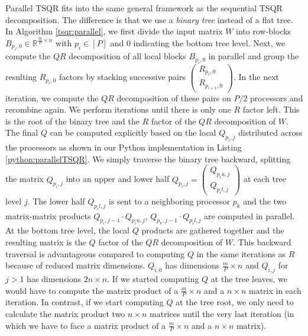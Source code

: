 \documentclass{article}
\begin{document}
Parallel TSQR fits into the same general framework as the sequential TSQR
decomposition. The difference is that we use a \textit{binary tree} instead of a
flat tree. In Algorithm \ref{tsqr:parallel}, we first divide the input matrix
$W$ into row-blocks $B_{p_i,0} \in \mathbb{R}^{\frac{m}{P} \times n}$ with $p_i
\in [P]$ and $0$ indicating the bottom tree level. Next, we compute the $QR$
decomposition of all local blocks $B_{p_i,0}$ in parallel and group the
resulting $R_{p_i,0}$ factors by stacking successive pairs
$\left(\begin{smallmatrix} R_{p_i,0} \\
R_{p_{i+1},0} \end{smallmatrix}\right)$. In the next iteration, we compute the
$QR$ decomposition of these pairs on $P / 2$ processors and recombine again. We
perform iterations until there is only one $R$ factor left. This is the root of
the binary tree and the $R$ factor of the $QR$ decomposition of $W$. The final
$Q$ can be computed explicitly based on the local $Q_{p_i,j}$ distributed across
the processors as shown in our Python implementation in Listing
\ref{python:parallelTSQR}. We simply traverse the binary tree backward,
splitting the matrix $Q_{p_i,j}$ into an upper and lower half $Q_{p_i,j} =
\left(\begin{smallmatrix} Q_{p_iu,j} \\ Q_{p_il,j} \end{smallmatrix}\right)$ at
each tree level $j$. The lower half $Q_{p_il,j}$ is sent to a neighboring
processor $p_k$ and the two matrix-matrix products $Q_{p_i,j-1} \cdot
Q_{p_iu,j}$, $Q_{p_k,j-1} \cdot Q_{p_il,j}$ are computed in parallel. At the
bottom tree level, the local $Q$ products are gathered together and the
resulting matrix is the $Q$ factor of the $QR$ decomposition of $W$. This
backward traversal is advantageous compared to computing $Q$ in the same
iterations as $R$ because of reduced matrix dimensions. $Q_{i,0}$ has dimensions
$\frac{m}{P} \times n$ and $Q_{i,j}$ for $j > 1$ has dimensions $2n \times n$.
If we started computing $Q$ at the tree leaves, we would have to compute the
matrix product of a $\frac{m}{P} \times n$ and a $n \times n$ matrix in each
iteration. In contrast, if we start computing $Q$ at the tree root, we only need
to calculate the matrix product two $n \times n$ matrices until the very last
iteration (in which we have to face a matrix product of a $\frac{m}{P} \times n$
and a $n \times n$ matrix).
\end{document}
